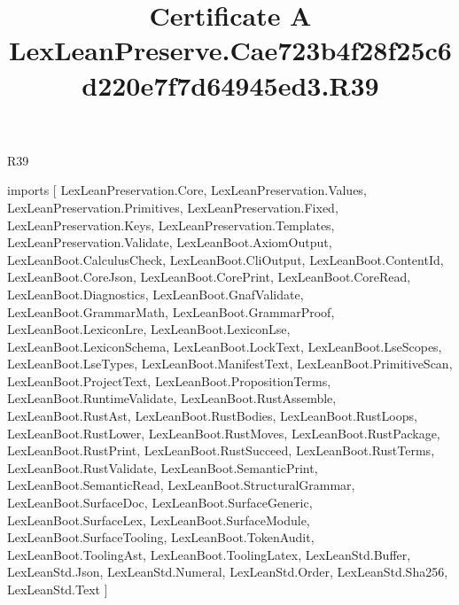 \begin{lexlean}{R39}
\title{Certificate A LexLeanPreserve.Cae723b4f28f25c6d220e7f7d64945ed3.R39}
\begin{coremodule}
imports [
  LexLeanPreservation.Core,
  LexLeanPreservation.Values,
  LexLeanPreservation.Primitives,
  LexLeanPreservation.Fixed,
  LexLeanPreservation.Keys,
  LexLeanPreservation.Templates,
  LexLeanPreservation.Validate,
  LexLeanBoot.AxiomOutput,
  LexLeanBoot.CalculusCheck,
  LexLeanBoot.CliOutput,
  LexLeanBoot.ContentId,
  LexLeanBoot.CoreJson,
  LexLeanBoot.CorePrint,
  LexLeanBoot.CoreRead,
  LexLeanBoot.Diagnostics,
  LexLeanBoot.GnafValidate,
  LexLeanBoot.GrammarMath,
  LexLeanBoot.GrammarProof,
  LexLeanBoot.LexiconLre,
  LexLeanBoot.LexiconLse,
  LexLeanBoot.LexiconSchema,
  LexLeanBoot.LockText,
  LexLeanBoot.LseScopes,
  LexLeanBoot.LseTypes,
  LexLeanBoot.ManifestText,
  LexLeanBoot.PrimitiveScan,
  LexLeanBoot.ProjectText,
  LexLeanBoot.PropositionTerms,
  LexLeanBoot.RuntimeValidate,
  LexLeanBoot.RustAssemble,
  LexLeanBoot.RustAst,
  LexLeanBoot.RustBodies,
  LexLeanBoot.RustLoops,
  LexLeanBoot.RustLower,
  LexLeanBoot.RustMoves,
  LexLeanBoot.RustPackage,
  LexLeanBoot.RustPrint,
  LexLeanBoot.RustSucceed,
  LexLeanBoot.RustTerms,
  LexLeanBoot.RustValidate,
  LexLeanBoot.SemanticPrint,
  LexLeanBoot.SemanticRead,
  LexLeanBoot.StructuralGrammar,
  LexLeanBoot.SurfaceDoc,
  LexLeanBoot.SurfaceGeneric,
  LexLeanBoot.SurfaceLex,
  LexLeanBoot.SurfaceModule,
  LexLeanBoot.SurfaceTooling,
  LexLeanBoot.TokenAudit,
  LexLeanBoot.ToolingAst,
  LexLeanBoot.ToolingLatex,
  LexLeanStd.Buffer,
  LexLeanStd.Json,
  LexLeanStd.Numeral,
  LexLeanStd.Order,
  LexLeanStd.Sha256,
  LexLeanStd.Text
]


\end{coremodule}
\end{lexlean}
